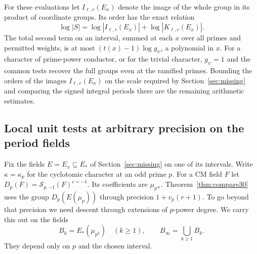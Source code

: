\documentclass[a4paper,11pt]{article}
\theoremstyle{definition}
\theoremstyle{remark}
\numberwithin{equation}{section}
\begin{document}
For these evaluations let \(I_{\ell,r}(E_x)\) denote
the image of the whole group in its product of coordinate
groups. Its order has the exact relation
\[
 \log |S|=\log |I_{\ell,r}(E_x)|
                         +\log |K_{\ell,r}(E_x)|.
\]
The total second term on an interval, summed at each
\(x\) over all primes and permitted weights, is at most
\((t(x)-1)\log g_\psi\), a polynomial in \(x\).
For a character of prime-power conductor, or for the
trivial character, \(g_\psi=1\) and the common tests
recover the full groups even at the ramified primes.
Bounding the orders of the images \(I_{\ell,r}(E_x)\)
on the scale required by Section~\ref{sec:missing}
and comparing the signed integral periods there are
the remaining arithmetic estimates.


\subsection{Local unit tests at arbitrary precision on the period fields}
\label{sec:idealprecision608}

Fix the fields \(E=E_x\subseteq E_*\) of Section~\ref{sec:missing}
on one of its intervals. Write \(\kappa=\kappa_p\) for the
cyclotomic character at an odd prime \(p\). For a CM field \(F\)
let \(D_p(F)=\mathcal S_{p,-1}(F)^{c=-1}\). Its coefficients
are \(\mu_{p^\infty}\). Theorem~\ref{thm:compare30} uses the
group \(D_p(E(\mu_p))\) through precision \(1+v_p(r+1)\).
To go beyond that precision we need descent through extensions
of \(p\)-power degree. We carry this out on the fields
\[
 B_k=E_*(\mu_{p^k})\quad(k\ge1),\qquad
 B_\infty=\bigcup_{k\ge1}B_k .
\]
They depend only on \(p\) and the chosen interval.
\end{document}

